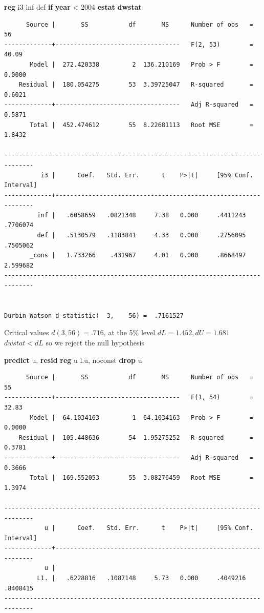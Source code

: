 \documentclass[
]{book}
\newenvironment{Shaded}{\begin{snugshade}}{\end{snugshade}}
\newcommand{\FunctionTok}[1]{\textcolor[rgb]{0.13,0.29,0.53}{\textbf{#1}}}
\newcommand{\KeywordTok}[1]{\textcolor[rgb]{0.13,0.29,0.53}{\textbf{#1}}}
\newcommand{\NormalTok}[1]{#1}
\newcommand{\OtherTok}[1]{\textcolor[rgb]{0.56,0.35,0.01}{#1}}
\begin{document}
\begin{Shaded}
\begin{Highlighting}[]
\KeywordTok{reg}\NormalTok{ i3 inf def }\KeywordTok{if} \FunctionTok{year}\NormalTok{ \textless{} 2004}
\KeywordTok{estat} \KeywordTok{dwstat}
\end{Highlighting}
\end{Shaded}

\begin{verbatim}
      Source |       SS           df       MS      Number of obs   =        56
-------------+----------------------------------   F(2, 53)        =     40.09
       Model |  272.420338         2  136.210169   Prob > F        =    0.0000
    Residual |  180.054275        53  3.39725047   R-squared       =    0.6021
-------------+----------------------------------   Adj R-squared   =    0.5871
       Total |  452.474612        55  8.22681113   Root MSE        =    1.8432

------------------------------------------------------------------------------
          i3 |      Coef.   Std. Err.      t    P>|t|     [95% Conf. Interval]
-------------+----------------------------------------------------------------
         inf |   .6058659   .0821348     7.38   0.000     .4411243    .7706074
         def |   .5130579   .1183841     4.33   0.000     .2756095    .7505062
       _cons |   1.733266    .431967     4.01   0.000     .8668497    2.599682
------------------------------------------------------------------------------


Durbin-Watson d-statistic(  3,    56) =  .7161527
\end{verbatim}

Critical values \(d(3,56)=.716\), at the 5\% level \(dL = 1.452, dU=1.681\)
\(dwstat < dL\) so we reject the null hypothesis

\begin{Shaded}
\begin{Highlighting}[]
\KeywordTok{predict}\NormalTok{ u, }\KeywordTok{resid}
\KeywordTok{reg}\NormalTok{ u }\OtherTok{l}\NormalTok{.u, noconst}
\KeywordTok{drop}\NormalTok{ u}
\end{Highlighting}
\end{Shaded}

\begin{verbatim}
      Source |       SS           df       MS      Number of obs   =        55
-------------+----------------------------------   F(1, 54)        =     32.83
       Model |  64.1034163         1  64.1034163   Prob > F        =    0.0000
    Residual |  105.448636        54  1.95275252   R-squared       =    0.3781
-------------+----------------------------------   Adj R-squared   =    0.3666
       Total |  169.552053        55  3.08276459   Root MSE        =    1.3974

------------------------------------------------------------------------------
           u |      Coef.   Std. Err.      t    P>|t|     [95% Conf. Interval]
-------------+----------------------------------------------------------------
           u |
         L1. |   .6228816   .1087148     5.73   0.000     .4049216    .8408415
------------------------------------------------------------------------------
\end{verbatim}
\end{document}
